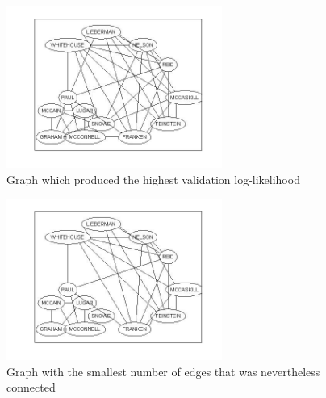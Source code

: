 \documentclass[]{article}
\begin{document}
\begin{figure}
\begin{center}
\includegraphics[width=200pt]{figures/fig4.jpg}
\caption{Graph which produced the highest validation log-likelihood}
\end{center}
\end{figure}

\begin{figure}
\begin{center}
\includegraphics[width=200pt]{figures/fig5.jpg}
\caption{Graph with the smallest number of edges that was nevertheless connected}
\end{center}
\end{figure}
\end{document}
